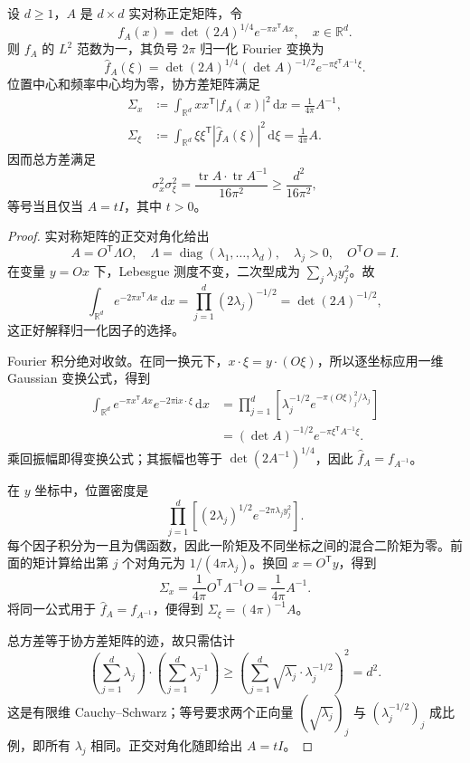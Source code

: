 \begin{proposition}\label{b2:prop:20-gaussian-covariance}
设 \(d\geq1\)，\(A\) 是 \(d\times d\) 实对称正定矩阵，令
\[
 f_A(x)=\det(2A)^{1/4}e^{-\pi x^{\mathsf T}Ax},
 \quad
 x\in\mathbb R^d.
\]
则 \(f_A\) 的 \(L^2\) 范数为一，其负号 \(2\pi\) 归一化 Fourier 变换为
\[
 \widehat f_A(\xi)
 =\det(2A)^{1/4}(\det A)^{-1/2}
       e^{-\pi\xi^{\mathsf T}A^{-1}\xi}.
\]
位置中心和频率中心均为零，协方差矩阵满足
\[
 \begin{aligned}
 \Sigma_x
 &\coloneqq\int_{\mathbb R^d}xx^{\mathsf T}|f_A(x)|^2\,\mathrm dx
 =\frac1{4\pi}A^{-1},\\
 \Sigma_\xi
 &\coloneqq\int_{\mathbb R^d}\xi\xi^{\mathsf T}
                |\widehat f_A(\xi)|^2\,\mathrm d\xi
 =\frac1{4\pi}A.
 \end{aligned}
\]
因而总方差满足
\[
 \sigma_x^2\sigma_\xi^2
 =\frac{\operatorname{tr}A\cdot\operatorname{tr}A^{-1}}{16\pi^2}
 \geq\frac{d^2}{16\pi^2},
\]
等号当且仅当 \(A=tI\)，其中 \(t>0\)。
\end{proposition}
\begin{proof}
实对称矩阵的正交对角化给出
\[
 A=O^{\mathsf T}\Lambda O,
 \quad
 \Lambda=\operatorname{diag}(\lambda_1,\ldots,\lambda_d),
 \quad
 \lambda_j>0,
 \quad
 O^{\mathsf T}O=I.
\]
在变量 \(y=Ox\) 下，Lebesgue 测度不变，二次型成为
\(\sum_j\lambda_jy_j^2\)。故
\[
 \int_{\mathbb R^d}e^{-2\pi x^{\mathsf T}Ax}\,\mathrm dx
 =\prod_{j=1}^d(2\lambda_j)^{-1/2}
 =\det(2A)^{-1/2},
\]
这正好解释归一化因子的选择。

Fourier 积分绝对收敛。在同一换元下，\(x\cdot\xi=y\cdot(O\xi)\)，所以逐坐标应用一维 Gaussian 变换公式，得到
\[
 \begin{aligned}
 \int_{\mathbb R^d}
 e^{-\pi x^{\mathsf T}Ax}e^{-2\pi\mathrm i x\cdot\xi}\,\mathrm dx
 &=\prod_{j=1}^d
   \left[\lambda_j^{-1/2}
   e^{-\pi(O\xi)_j^2/\lambda_j}\right]\\
 &=(\det A)^{-1/2}e^{-\pi\xi^{\mathsf T}A^{-1}\xi}.
 \end{aligned}
\]
乘回振幅即得变换公式；其振幅也等于
\(\det(2A^{-1})^{1/4}\)，因此 \(\widehat f_A=f_{A^{-1}}\)。

在 \(y\) 坐标中，位置密度是
\[
 \prod_{j=1}^d
 \left[(2\lambda_j)^{1/2}e^{-2\pi\lambda_jy_j^2}\right].
\]
每个因子积分为一且为偶函数，因此一阶矩及不同坐标之间的混合二阶矩为零。前面的矩计算给出第 \(j\) 个对角元为 \(1/(4\pi\lambda_j)\)。换回 \(x=O^{\mathsf T}y\)，得到
\[
 \Sigma_x
 =\frac1{4\pi}O^{\mathsf T}\Lambda^{-1}O
 =\frac1{4\pi}A^{-1}.
\]
将同一公式用于 \(\widehat f_A=f_{A^{-1}}\)，便得到
\(\Sigma_\xi=(4\pi)^{-1}A\)。

总方差等于协方差矩阵的迹，故只需估计
\[
 \left(\sum_{j=1}^d\lambda_j\right)
 \cdot
 \left(\sum_{j=1}^d\lambda_j^{-1}\right)
 \geq
 \left(\sum_{j=1}^d
       \sqrt{\lambda_j}\cdot\lambda_j^{-1/2}\right)^2
 =d^2.
\]
这是有限维 Cauchy--Schwarz；等号要求两个正向量
\((\sqrt{\lambda_j})_j\) 与 \((\lambda_j^{-1/2})_j\) 成比例，即所有 \(\lambda_j\) 相同。正交对角化随即给出 \(A=tI\)。
\end{proof}

